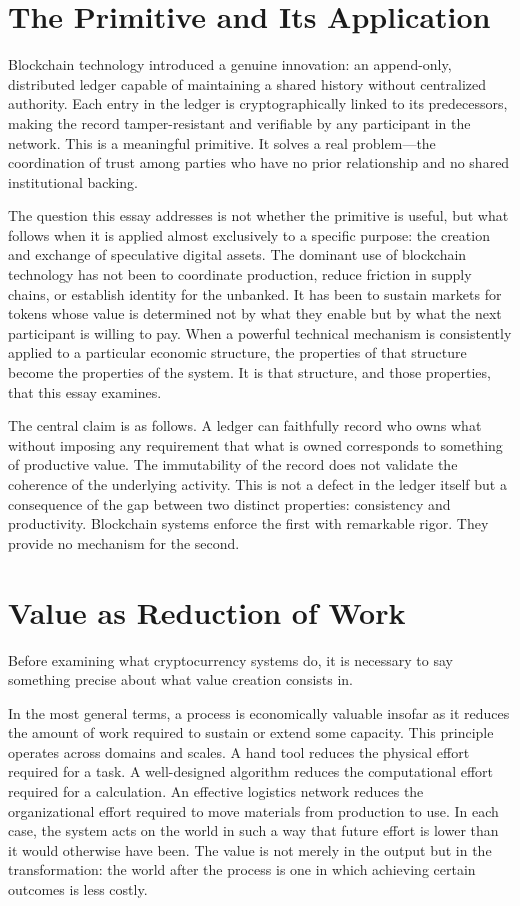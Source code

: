 \documentclass[12pt, oneside]{article}
\theoremstyle{definition}
\begin{document}
\section{The Primitive and Its Application}

Blockchain technology introduced a genuine innovation: an append-only, distributed ledger capable of maintaining a shared history without centralized authority. Each entry in the ledger is cryptographically linked to its predecessors, making the record tamper-resistant and verifiable by any participant in the network. This is a meaningful primitive. It solves a real problem---the coordination of trust among parties who have no prior relationship and no shared institutional backing.

The question this essay addresses is not whether the primitive is useful, but what follows when it is applied almost exclusively to a specific purpose: the creation and exchange of speculative digital assets. The dominant use of blockchain technology has not been to coordinate production, reduce friction in supply chains, or establish identity for the unbanked. It has been to sustain markets for tokens whose value is determined not by what they enable but by what the next participant is willing to pay. When a powerful technical mechanism is consistently applied to a particular economic structure, the properties of that structure become the properties of the system. It is that structure, and those properties, that this essay examines.

The central claim is as follows. A ledger can faithfully record who owns what without imposing any requirement that what is owned corresponds to something of productive value. The immutability of the record does not validate the coherence of the underlying activity. This is not a defect in the ledger itself but a consequence of the gap between two distinct properties: consistency and productivity. Blockchain systems enforce the first with remarkable rigor. They provide no mechanism for the second.

\section{Value as Reduction of Work}

Before examining what cryptocurrency systems do, it is necessary to say something precise about what value creation consists in.

In the most general terms, a process is economically valuable insofar as it reduces the amount of work required to sustain or extend some capacity. This principle operates across domains and scales. A hand tool reduces the physical effort required for a task. A well-designed algorithm reduces the computational effort required for a calculation. An effective logistics network reduces the organizational effort required to move materials from production to use. In each case, the system acts on the world in such a way that future effort is lower than it would otherwise have been. The value is not merely in the output but in the transformation: the world after the process is one in which achieving certain outcomes is less costly.
\end{document}
